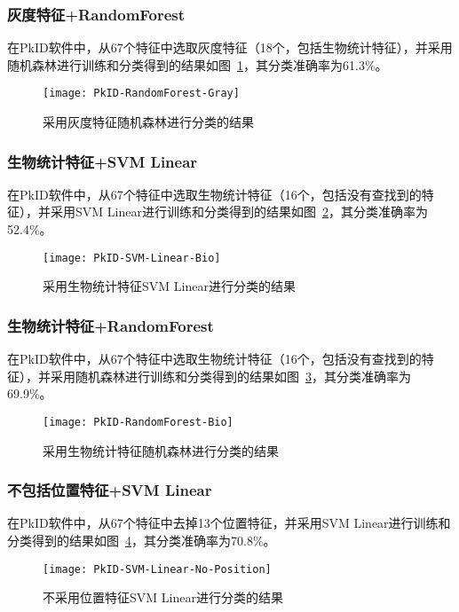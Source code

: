 \subsubsection{灰度特征+RandomForest}
在PkID软件中，从67个特征中选取灰度特征（18个，包括生物统计特征），并采用随机森林进行训练和分类得到的结果如图~\ref{fig:PkID-RandomForest-Gray}，其分类准确率为61.3\%。
\begin{figure}[!ht]
\centering
\texttt{[image: PkID-RandomForest-Gray]}
\caption{采用灰度特征随机森林进行分类的结果}
\label{fig:PkID-RandomForest-Gray}
\end{figure}

\subsubsection{生物统计特征+SVM Linear}
在PkID软件中，从67个特征中选取生物统计特征（16个，包括没有查找到的特征），并采用SVM Linear进行训练和分类得到的结果如图~\ref{fig:PkID-SVM-Linear-Bio}，其分类准确率为52.4\%。
\begin{figure}[!ht]
\centering
\texttt{[image: PkID-SVM-Linear-Bio]}
\caption{采用生物统计特征SVM Linear进行分类的结果}
\label{fig:PkID-SVM-Linear-Bio}
\end{figure}

\subsubsection{生物统计特征+RandomForest}
在PkID软件中，从67个特征中选取生物统计特征（16个，包括没有查找到的特征），并采用随机森林进行训练和分类得到的结果如图~\ref{fig:PkID-RandomForest-Bio}，其分类准确率为69.9\%。
\begin{figure}[!ht]
\centering
\texttt{[image: PkID-RandomForest-Bio]}
\caption{采用生物统计特征随机森林进行分类的结果}
\label{fig:PkID-RandomForest-Bio}
\end{figure}

\subsubsection{不包括位置特征+SVM Linear}
在PkID软件中，从67个特征中去掉13个位置特征，并采用SVM Linear进行训练和分类得到的结果如图~\ref{fig:PkID-SVM-Linear-No-Position}，其分类准确率为70.8\%。

\begin{figure}[!ht]
\centering
\texttt{[image: PkID-SVM-Linear-No-Position]}
\caption{不采用位置特征SVM Linear进行分类的结果}
\label{fig:PkID-SVM-Linear-No-Position}
\end{figure}


